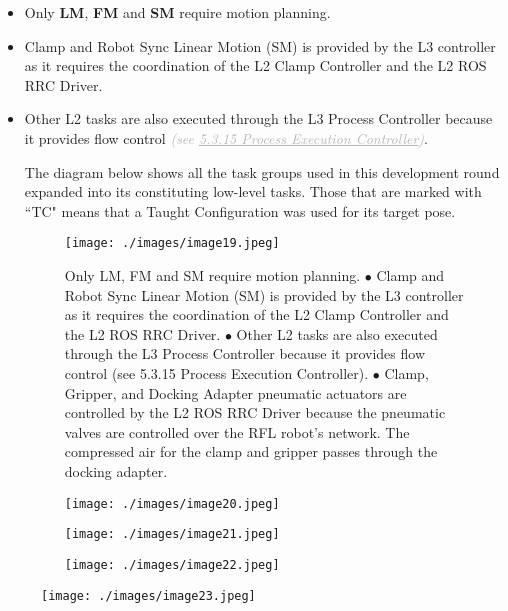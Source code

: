 \begin{itemize}
	\item Only \textbf{LM}, \textbf{FM }and \textbf{SM }require motion planning. 

	\item Clamp and Robot Sync Linear Motion (SM) is provided by the L3 controller as it requires the coordination of the L2 Clamp Controller and the L2 ROS RRC Driver. 

	\item Other L2 tasks are also executed through the L3 Process Controller because it provides flow control \textit{\textcolor[HTML]{B7B7B7}{(see \uline{5.3.15 Process Execution Controller})}}. 

The diagram below shows all the task groups used in this development round expanded into its constituting low-level tasks. Those that are marked with ``TC" means that a Taught Configuration was used for its target pose.

\begin{figure}[H]
\texttt{[image: ./images/image19.jpeg]}
\caption{Only LM, FM and SM require motion planning. $\bullet$ Clamp and Robot Sync Linear Motion (SM) is provided by the L3 controller as it requires the coordination of the L2 Clamp Controller and the L2 ROS RRC Driver. $\bullet$ Other L2 tasks are also executed through the L3 Process Controller because it provides flow control (see 5.3.15 Process Execution Controller). $\bullet$ Clamp, Gripper, and Docking Adapter pneumatic actuators are controlled by the L2 ROS RRC Driver because the pneumatic valves are controlled over the RFL robot's network. The compressed air for the clamp and gripper passes through the docking adapter.}
\label{fig:only_lm_fm_and_sm}
\end{figure}


\begin{figure}[H]
\texttt{[image: ./images/image20.jpeg]}
\end{figure}


\begin{figure}[H]
\texttt{[image: ./images/image21.jpeg]}
\end{figure}


\begin{figure}[H]
\texttt{[image: ./images/image22.jpeg]}
\end{figure}


\end{itemize}
\vspace{1\baselineskip}
\begin{figure}[H]
\texttt{[image: ./images/image23.jpeg]}
\end{figure}


